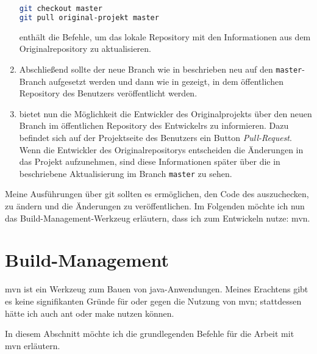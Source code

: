 \begin{enumerate}
\begin{lstlisting}[language=sh,caption={Mit git den Branch \texttt{master} auschecken und aktualisieren},label=\lstlbl{git-master-original-aktualisieren}]
git checkout master
git pull original-projekt master
\end{lstlisting}

 enthält die Befehle, um das lokale Repository mit den Informationen aus dem Originalrepository zu aktualisieren.

\item Abschließend sollte der neue Branch wie in  beschrieben neu auf den \texttt{master}-Branch aufgesetzt werden und dann wie in  gezeigt, in dem öffentlichen Repository des Benutzers veröffentlicht werden.

\item {} bietet nun die Möglichkeit die Entwickler des Originalprojekts über den neuen Branch im öffentlichen Repository des Entwickelrs zu informieren. Dazu befindet sich auf der Projektseite des Benutzers ein Button \emph{Pull-Request}. Wenn die Entwickler des Originalrepositorys entscheiden die Änderungen in das Projekt aufzunehmen, sind diese Informationen später über die in  beschriebene Aktualisierung im Branch \texttt{master} zu sehen.
\end{enumerate}

Meine Ausführungen über \gls{git} sollten es ermöglichen, den Code des \md auszuchecken, zu ändern und die Änderungen zu veröffentlichen. Im Folgenden möchte ich nun das Build-Management-Werkzeug erläutern, dass ich zum Entwickeln nutze: \gls{mvn}.

\section{Build-Management}
\gls{mvn} ist ein Werkzeug zum Bauen von \gls{java}-Anwendungen. Meines Erachtens gibt es keine signifikanten Gründe für oder gegen die Nutzung von \gls{mvn}; stattdessen hätte ich auch \gls{ant} oder \gls{make} nutzen können.

In diesem Abschnitt möchte ich die grundlegenden Befehle für die Arbeit mit \gls{mvn} erläutern.

